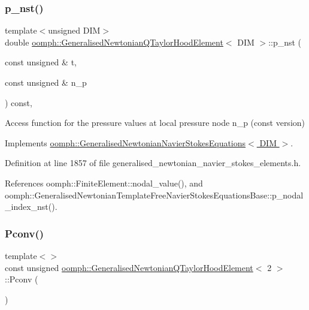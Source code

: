 \subsubsection{\texorpdfstring{p\+\_\+nst()}{p\_nst()}\hspace{0.1cm}{\footnotesize\ttfamily [2/2]}}
{\footnotesize\ttfamily template$<$unsigned D\+IM$>$ \\
double \hyperlink{classoomph_1_1GeneralisedNewtonianQTaylorHoodElement}{oomph\+::\+Generalised\+Newtonian\+Q\+Taylor\+Hood\+Element}$<$ D\+IM $>$\+::p\+\_\+nst (\begin{DoxyParamCaption}\item[{const unsigned \&}]{t,  }\item[{const unsigned \&}]{n\+\_\+p }\end{DoxyParamCaption}) const\hspace{0.3cm}{\ttfamily [inline]}, {\ttfamily [virtual]}}



Access function for the pressure values at local pressure node n\+\_\+p (const version) 



Implements \hyperlink{classoomph_1_1GeneralisedNewtonianNavierStokesEquations_a82eebde146ffb1b65a6c1ed8583c87f6}{oomph\+::\+Generalised\+Newtonian\+Navier\+Stokes\+Equations$<$ D\+I\+M $>$}.



Definition at line 1857 of file generalised\+\_\+newtonian\+\_\+navier\+\_\+stokes\+\_\+elements.\+h.



References oomph\+::\+Finite\+Element\+::nodal\+\_\+value(), and oomph\+::\+Generalised\+Newtonian\+Template\+Free\+Navier\+Stokes\+Equations\+Base\+::p\+\_\+nodal\+\_\+index\+\_\+nst().

\mbox{\label{classoomph_1_1GeneralisedNewtonianQTaylorHoodElement_aa706c4a6713ca3dc58c43e9dbb1341d9}} 
\subsubsection{\texorpdfstring{Pconv()}{Pconv()}\hspace{0.1cm}{\footnotesize\ttfamily [1/2]}}
{\footnotesize\ttfamily template$<$$>$ \\
const unsigned \hyperlink{classoomph_1_1GeneralisedNewtonianQTaylorHoodElement}{oomph\+::\+Generalised\+Newtonian\+Q\+Taylor\+Hood\+Element}$<$ 2 $>$\+::Pconv (\begin{DoxyParamCaption}{ }\end{DoxyParamCaption})\hspace{0.3cm}{\ttfamily [protected]}}



